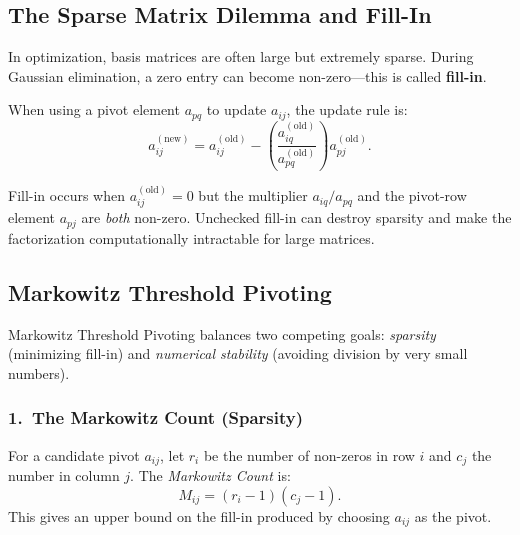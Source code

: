 \documentclass[11pt, a4paper]{article}
\begin{document}
\subsection{The Sparse Matrix Dilemma and Fill-In}

In optimization, basis matrices are often large but extremely sparse. During Gaussian elimination, a zero entry can become non-zero---this is called \textbf{fill-in}.

When using a pivot element $a_{pq}$ to update $a_{ij}$, the update rule is:
\begin{equation}
a_{ij}^{(\text{new})} = a_{ij}^{(\text{old})} - \left(\frac{a_{iq}^{(\text{old})}}{a_{pq}^{(\text{old})}}\right)a_{pj}^{(\text{old})}.
\end{equation}

\begin{warning}
Fill-in occurs when $a_{ij}^{(\text{old})} = 0$ but the multiplier $a_{iq}/a_{pq}$ and the pivot-row element $a_{pj}$ are \emph{both} non-zero. Unchecked fill-in can destroy sparsity and make the factorization computationally intractable for large matrices.
\end{warning}

\subsection{Markowitz Threshold Pivoting}

Markowitz Threshold Pivoting balances two competing goals: \emph{sparsity} (minimizing fill-in) and \emph{numerical stability} (avoiding division by very small numbers).

\subsubsection*{1.\ The Markowitz Count (Sparsity)}

\begin{definition}
For a candidate pivot $a_{ij}$, let $r_i$ be the number of non-zeros in row $i$ and $c_j$ the number in column $j$. The \emph{Markowitz Count} is:
\[
M_{ij} = (r_i - 1)(c_j - 1).
\]
This gives an upper bound on the fill-in produced by choosing $a_{ij}$ as the pivot.
\end{definition}
\end{document}
